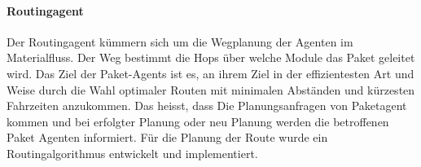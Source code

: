 \paragraph{Routingagent}
Der Routingagent kümmern sich um die Wegplanung der Agenten im Materialfluss. Der Weg bestimmt die Hops über welche Module das Paket geleitet wird.
Das Ziel der Paket-Agents ist es, an ihrem Ziel in der effizientesten Art und Weise durch die Wahl optimaler Routen 
mit minimalen Abständen und kürzesten Fahrzeiten anzukommen. Das heisst, dass Die Planungsanfragen
von Paketagent kommen und bei erfolgter Planung oder neu Planung werden die betroffenen Paket Agenten informiert. Für die Planung der 
Route wurde ein Routingalgorithmus entwickelt und implementiert.